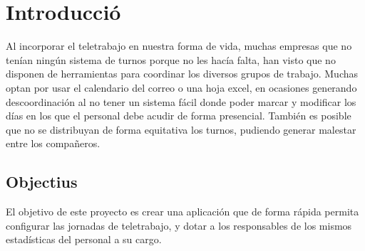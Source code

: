 \documentclass[11pt,spanish,listoffigures,listoftables]{tfgetsinf}
\begin{document}

\mainmatter


\chapter{Introducci\'o}

Al incorporar el teletrabajo en nuestra forma de vida, muchas empresas que no tenían ningún sistema de turnos porque no les hacía falta, han visto que no disponen de herramientas para coordinar los diversos grupos de trabajo.
Muchas optan por usar el calendario del correo o  una hoja excel, en ocasiones generando descoordinación al no tener un sistema fácil donde poder marcar y modificar los días en los que el personal debe acudir de forma presencial.
También es posible que no se distribuyan de forma equitativa los turnos, pudiendo generar malestar entre los compañeros.

%
%
\section{Objectius}

El objetivo de este proyecto es crear una aplicación que de forma rápida permita configurar las jornadas de teletrabajo, y dotar a los responsables de los mismos estadísticas del personal a su cargo.




\end{document}
